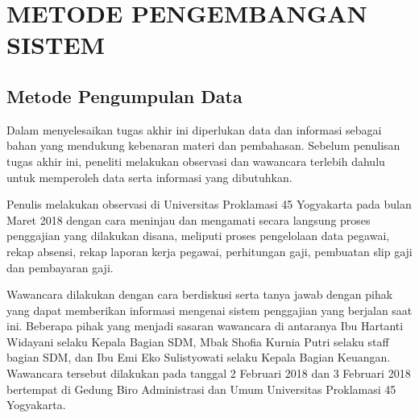 
\chapter{METODE PENGEMBANGAN SISTEM}
\section{Metode Pengumpulan Data}
Dalam menyelesaikan tugas akhir ini diperlukan data dan informasi sebagai bahan yang mendukung kebenaran materi dan pembahasan. Sebelum penulisan tugas akhir ini, peneliti melakukan observasi dan wawancara terlebih dahulu untuk memperoleh data serta informasi yang dibutuhkan.
    
Penulis melakukan observasi di Universitas Proklamasi 45 Yogyakarta pada bulan Maret 2018 dengan cara meninjau dan mengamati secara langsung proses penggajian yang dilakukan disana, meliputi proses pengelolaan data pegawai, rekap absensi, rekap laporan kerja pegawai, perhitungan gaji, pembuatan slip gaji dan pembayaran gaji.
    
Wawancara dilakukan dengan cara berdiskusi serta tanya jawab dengan pihak yang dapat memberikan informasi mengenai sistem penggajian yang berjalan saat ini. Beberapa pihak yang menjadi sasaran wawancara di antaranya Ibu Hartanti Widayani selaku Kepala Bagian SDM, Mbak Shofia Kurnia Putri selaku staff bagian SDM, dan Ibu Emi Eko Sulistyowati selaku Kepala Bagian Keuangan. Wawancara tersebut dilakukan pada tanggal 2 Februari 2018 dan 3 Februari 2018 bertempat di Gedung Biro Administrasi dan Umum Universitas Proklamasi 45 Yogyakarta.
    
